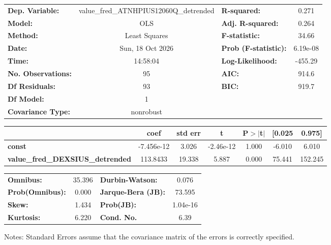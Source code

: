 \begin{center}
\begin{tabular}{lclc}
\toprule
\textbf{Dep. Variable:}                  & value\_fred\_ATNHPIUS12060Q\_detrended & \textbf{  R-squared:         } &     0.271   \\
\textbf{Model:}                          &                  OLS                   & \textbf{  Adj. R-squared:    } &     0.264   \\
\textbf{Method:}                         &             Least Squares              & \textbf{  F-statistic:       } &     34.66   \\
\textbf{Date:}                           &            Sun, 18 Oct 2026            & \textbf{  Prob (F-statistic):} &  6.19e-08   \\
\textbf{Time:}                           &                14:58:04                & \textbf{  Log-Likelihood:    } &   -455.29   \\
\textbf{No. Observations:}               &                     95                 & \textbf{  AIC:               } &     914.6   \\
\textbf{Df Residuals:}                   &                     93                 & \textbf{  BIC:               } &     919.7   \\
\textbf{Df Model:}                       &                      1                 & \textbf{                     } &             \\
\textbf{Covariance Type:}                &               nonrobust                & \textbf{                     } &             \\
\bottomrule
\end{tabular}
\begin{tabular}{lcccccc}
                                         & \textbf{coef} & \textbf{std err} & \textbf{t} & \textbf{P$> |$t$|$} & \textbf{[0.025} & \textbf{0.975]}  \\
\midrule
\textbf{const}                           &   -7.456e-12  &        3.026     & -2.46e-12  &         1.000        &       -6.010    &        6.010     \\
\textbf{value\_fred\_DEXSIUS\_detrended} &     113.8433  &       19.338     &     5.887  &         0.000        &       75.441    &      152.245     \\
\bottomrule
\end{tabular}
\begin{tabular}{lclc}
\textbf{Omnibus:}       & 35.396 & \textbf{  Durbin-Watson:     } &    0.076  \\
\textbf{Prob(Omnibus):} &  0.000 & \textbf{  Jarque-Bera (JB):  } &   73.595  \\
\textbf{Skew:}          &  1.434 & \textbf{  Prob(JB):          } & 1.04e-16  \\
\textbf{Kurtosis:}      &  6.220 & \textbf{  Cond. No.          } &     6.39  \\
\bottomrule
\end{tabular}
\end{center}

Notes: \newline
 [1] Standard Errors assume that the covariance matrix of the errors is correctly specified.